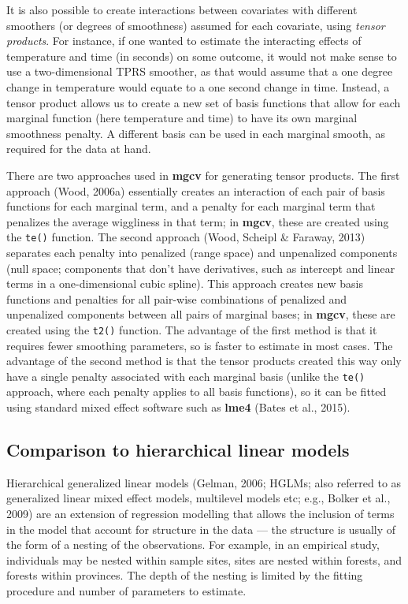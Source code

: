 \documentclass[12pt]{article}
\begin{document}
It is also possible to create interactions between covariates with
different smoothers (or degrees of smoothness) assumed for each
covariate, using \emph{tensor products}. For instance, if one wanted to
estimate the interacting effects of temperature and time (in seconds) on
some outcome, it would not make sense to use a two-dimensional TPRS
smoother, as that would assume that a one degree change in temperature
would equate to a one second change in time. Instead, a tensor product
allows us to create a new set of basis functions that allow for each
marginal function (here temperature and time) to have its own marginal
smoothness penalty. A different basis can be used in each marginal
smooth, as required for the data at hand.

There are two approaches used in \textbf{mgcv} for generating tensor
products. The first approach (Wood, 2006a) essentially creates an
interaction of each pair of basis functions for each marginal term, and
a penalty for each marginal term that penalizes the average wiggliness
in that term; in \textbf{mgcv}, these are created using the
\texttt{te()} function. The second approach (Wood, Scheipl \& Faraway,
2013) separates each penalty into penalized (range space) and
unpenalized components (null space; components that don't have
derivatives, such as intercept and linear terms in a one-dimensional
cubic spline). This approach creates new basis functions and penalties
for all pair-wise combinations of penalized and unpenalized components
between all pairs of marginal bases; in \textbf{mgcv}, these are created
using the \texttt{t2()} function. The advantage of the first method is
that it requires fewer smoothing parameters, so is faster to estimate in
most cases. The advantage of the second method is that the tensor
products created this way only have a single penalty associated with
each marginal basis (unlike the \texttt{te()} approach, where each
penalty applies to all basis functions), so it can be fitted using
standard mixed effect software such as \textbf{lme4} (Bates et al.,
2015).

\subsection{Comparison to hierarchical linear
models}\label{comparison-to-hierarchical-linear-models}

Hierarchical generalized linear models (Gelman, 2006; HGLMs; also
referred to as generalized linear mixed effect models, multilevel models
etc; e.g., Bolker et al., 2009) are an extension of regression modelling
that allows the inclusion of terms in the model that account for
structure in the data --- the structure is usually of the form of a
nesting of the observations. For example, in an empirical study,
individuals may be nested within sample sites, sites are nested within
forests, and forests within provinces. The depth of the nesting is
limited by the fitting procedure and number of parameters to estimate.
\end{document}

